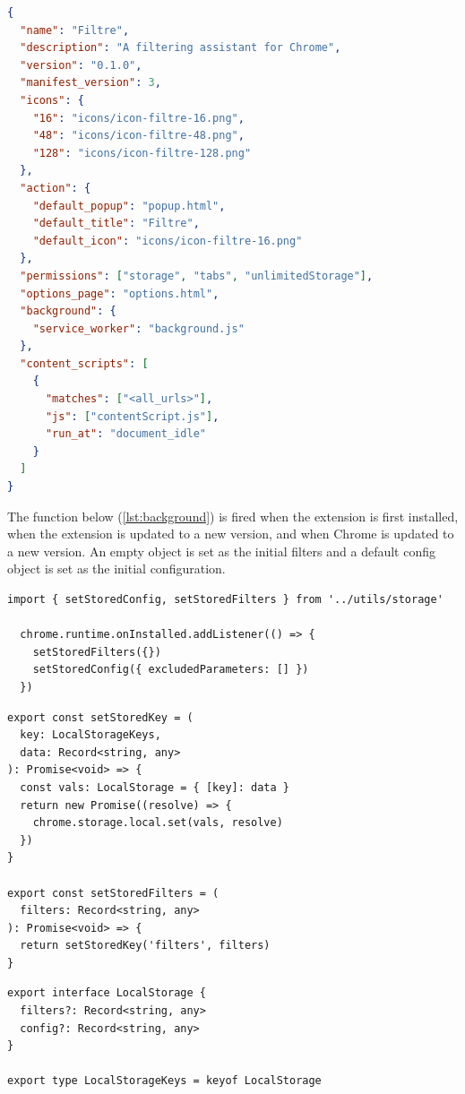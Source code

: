 \begin{lstlisting}[language=json, caption={Manifest File (JSON)}, label={lst:manifest}]
{
  "name": "Filtre",
  "description": "A filtering assistant for Chrome",
  "version": "0.1.0",
  "manifest_version": 3,
  "icons": {
    "16": "icons/icon-filtre-16.png",
    "48": "icons/icon-filtre-48.png",
    "128": "icons/icon-filtre-128.png"
  },
  "action": {
    "default_popup": "popup.html",
    "default_title": "Filtre",
    "default_icon": "icons/icon-filtre-16.png"
  },
  "permissions": ["storage", "tabs", "unlimitedStorage"],
  "options_page": "options.html",
  "background": {
    "service_worker": "background.js"
  },
  "content_scripts": [
    {
      "matches": ["<all_urls>"],
      "js": ["contentScript.js"],
      "run_at": "document_idle"
    }
  ]
}
\end{lstlisting}

The function below (\autoref{lst:background}) is fired when the extension is first installed, when the extension is updated to a new version, and when Chrome is updated to a new version. An empty object is set as the initial filters and a default config object is set as the initial configuration.

\begin{lstlisting}[style=ES6, caption={On install functions (TypeScript)}, label={lst:background}]
  import { setStoredConfig, setStoredFilters } from '../utils/storage'

  chrome.runtime.onInstalled.addListener(() => {
    setStoredFilters({})
    setStoredConfig({ excludedParameters: [] })
  })
\end{lstlisting}

\begin{lstlisting}[style=ES6, caption={Helper functions for Chrome Storage API (TypeScript)}]
export const setStoredKey = (
  key: LocalStorageKeys,
  data: Record<string, any>
): Promise<void> => {
  const vals: LocalStorage = { [key]: data }
  return new Promise((resolve) => {
    chrome.storage.local.set(vals, resolve)
  })
}

export const setStoredFilters = (
  filters: Record<string, any>
): Promise<void> => {
  return setStoredKey('filters', filters)
}
\end{lstlisting}

\begin{lstlisting}[style=ES6, caption={TypeScript interface of a LocalStorage object (TypeScript)}]
export interface LocalStorage {
  filters?: Record<string, any>
  config?: Record<string, any>
}

export type LocalStorageKeys = keyof LocalStorage
\end{lstlisting}

